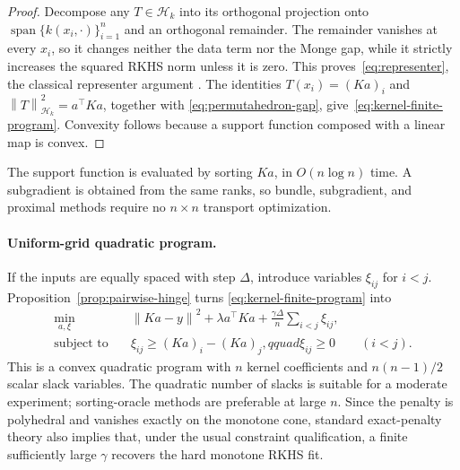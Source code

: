 \documentclass[11pt,a4paper]{article}
\theoremstyle{definition}
\theoremstyle{remark}
\newcommand{\Hcal}{\mathcal H}
\newcommand{\norm}[1]{\left\lVert #1\right\rVert}
\begin{document}
\begin{proof}
Decompose any $T\in\Hcal_k$ into its orthogonal projection onto
$\operatorname{span}\{k(x_i,\cdot)\}_{i=1}^n$ and an orthogonal remainder.
The remainder vanishes at every $x_i$, so it changes neither the data term nor
the Monge gap, while it strictly increases the squared RKHS norm unless it is
zero. This proves~\eqref{eq:representer}, the classical representer argument
\citep{KimeldorfWahba1971,ScholkopfHerbrichSmola2001}. The identities
$T(x_i)=(Ka)_i$ and $\norm{T}_{\Hcal_k}^2=a^\top Ka$, together with
\eqref{eq:permutahedron-gap}, give~\eqref{eq:kernel-finite-program}. Convexity
follows because a support function composed with a linear map is convex.
\end{proof}

The support function is evaluated by sorting $Ka$, in $O(n\log n)$ time. A
subgradient is obtained from the same ranks, so bundle, subgradient, and
proximal methods require no $n\times n$ transport optimization.

\paragraph{Uniform-grid quadratic program.}
If the inputs are equally spaced with step $\Delta$, introduce variables
$\xi_{ij}$ for $i<j$. Proposition~\ref{prop:pairwise-hinge} turns
\eqref{eq:kernel-finite-program} into
\begin{equation}\label{eq:kernel-qp}
\begin{aligned}
  \min_{a,\xi}\quad &
    \norm{Ka-y}^2+\lambda a^\top Ka
    +\frac{\gamma\Delta}{n}\sum_{i<j}\xi_{ij},\\
  \text{subject to}\quad &
    \xi_{ij}\geq(Ka)_i-(Ka)_j,qquad
    \xi_{ij}\geq0\qquad(i<j).
\end{aligned}
\end{equation}
This is a convex quadratic program with $n$ kernel coefficients and
$n(n-1)/2$ scalar slack variables. The quadratic number of slacks is suitable
for a moderate experiment; sorting-oracle methods are preferable at large
$n$. Since the penalty is polyhedral and vanishes exactly on the monotone
cone, standard exact-penalty theory also implies that, under the usual
constraint qualification, a finite sufficiently large $\gamma$ recovers the
hard monotone RKHS fit.
\end{document}
